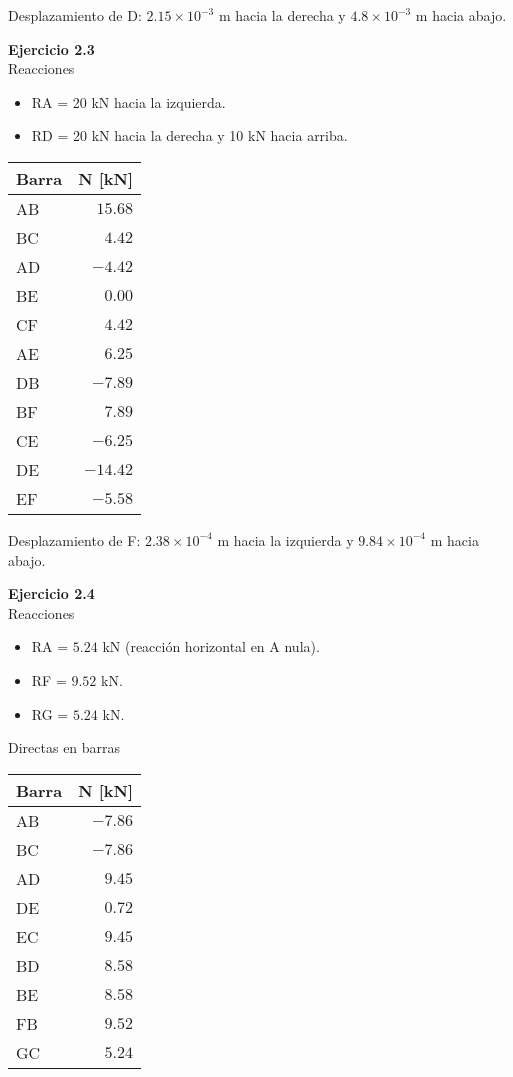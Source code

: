 Desplazamiento de D: $ 2.15 \times 10^{-3}$ m hacia la derecha y $4.8 \times 10^{-3}$ m hacia abajo.\newline

\textbf{Ejercicio 2.3}\\

Reacciones
\begin{itemize}
\item RA = 20 kN hacia la izquierda.
\item RD = 20 kN hacia la derecha y 10 kN hacia arriba.
\end{itemize}

\begin{center}
	\begin{tabular}{lr}
		\hline
		Barra & N [kN] \\
		\hline
AB & $15.68$ \\
BC & $4.42$ \\
AD & $-4.42$ \\
BE & $0.00$ \\
CF & $4.42$ \\
AE & $6.25$ \\
DB & $-7.89$ \\
BF & $7.89$ \\
CE & $-6.25$ \\
DE & $-14.42$ \\
EF & $-5.58$ \\
\hline
\end{tabular}
\end{center}

Desplazamiento de F: $2.38 \times 10^{-4}$ m hacia la izquierda y $9.84 \times 10^{-4}$ m hacia abajo.\newline


\textbf{Ejercicio 2.4}\\


Reacciones
\begin{itemize}
\item RA = $5.24$ kN (reacción horizontal en A nula).
\item RF = $9.52$ kN.
\item RG = $5.24$ kN.
\end{itemize}

Directas en barras

\begin{center}
	\begin{tabular}{lr}
		\hline
		Barra & N [kN] \\
		\hline
AB & $-7.86$ \\
BC & $-7.86$ \\
AD & $9.45$ \\
DE & $0.72$ \\
EC & $9.45$ \\
BD & $8.58$ \\
BE & $8.58$ \\
FB & $9.52$ \\
GC & $5.24$ \\
\hline
\end{tabular}
\end{center}

